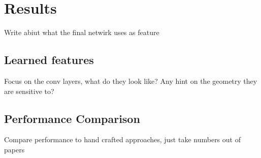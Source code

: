 \documentclass[main.tex]{subfiles}
\begin{document}
\chapter{Results}
Write abiut what the final netwirk uses as feature
\section{Learned features}
Focus on the conv layers, what do they look like? Any hint on the geometry they are sensitive to?
\section{Performance Comparison}
Compare performance to hand crafted approaches, just take numbers out of papers
\end{document}
